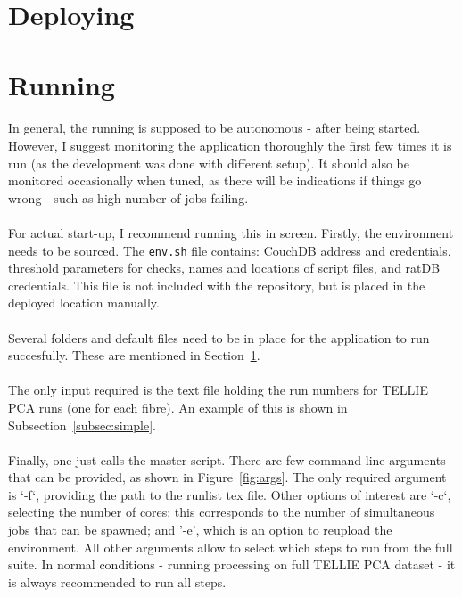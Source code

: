 \documentclass[12pt]{article}
\begin{document}
\clearpage

\section{Deploying}\label{sec:dep}

\section{Running}\label{sec:run}
\paragraph{}
In general, the running is supposed to be autonomous - after being started. However, I suggest monitoring the application thoroughly the first few times it is run (as the development was done with different setup). It should also be monitored occasionally when tuned, as there will be indications if things go wrong - such as high number of jobs failing. 

\paragraph{}
For actual start-up, I recommend running this in screen. Firstly, the environment needs to be sourced. The \texttt{env.sh} file contains: CouchDB address and credentials, threshold parameters for checks, names and locations of script files, and ratDB credentials. This file is not included with the repository, but is placed in the deployed location manually.

\paragraph{}
Several folders and default files need to be in place for the application to run succesfully. These are mentioned in Section~\ref{sec:dep}.

\paragraph{}
The only input required is the text file holding the run numbers for TELLIE PCA runs (one for each fibre). An example of this is shown in Subsection~\ref{subsec:simple}.

\paragraph{}
Finally, one just calls the master script. There are few command line arguments that can be provided, as shown in Figure~\ref{fig:args}. The only required argument is `-f`, providing the path to the runlist tex file. Other options of interest are `-c`, selecting the number of cores: this corresponds to the number of simultaneous jobs that can be spawned; and '-e', which is an option to reupload the environment. All other arguments allow to select which steps to run from the full suite. In normal conditions - running processing on full TELLIE PCA dataset - it is always recommended to run all steps.
\end{document}
